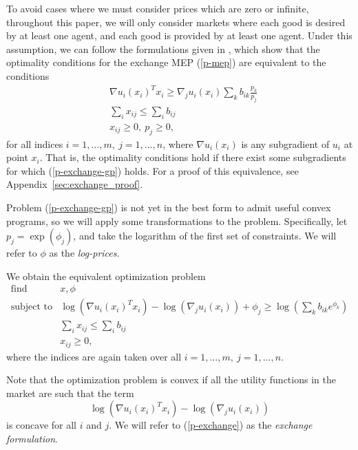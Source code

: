 \documentclass[12pt]{article}
\begin{document}
To avoid cases where we must consider prices which are zero or infinite,
throughout this paper, we will only consider markets where each good is desired
by at least one agent, and each good is provided by at least one agent. Under
this assumption, we can follow the formulations given in
\cite{jain2007polynomial, chen2007note, nenakov1983algorithm}, which show that
the optimality conditions for the exchange MEP (\ref{p-mep}) are equivalent to
the conditions
\begin{equation}
\begin{array}{ll}
& \nabla u_i(x_i)^T x_i \geq  \nabla_j u_i(x_i) \sum_k b_{ik} \frac{p_k}{p_j}\\
& \sum_i x_{ij} \leq \sum_i b_{ij}\\
& x_{ij} \geq 0,\ p_j \geq 0,
\end{array}
\label{p-exchange-gp}
\end{equation}
for all indices $i=1,\ldots,m,\ j=1,\ldots,n$, where $\nabla u_i(x_i)$
is any subgradient of $u_i$ at point $x_i$. That is, the optimality
conditions hold if there exist some subgradients for which (\ref{p-exchange-gp})
holds.
For a proof of this equivalence, see Appendix~\ref{sec:exchange_proof}.

Problem (\ref{p-exchange-gp}) is not yet in the best form to admit useful
convex programs, so we will apply some transformations to the problem.
Specifically, let $p_j = \exp(\phi_j)$, and take the logarithm of the first set
of constraints. We will refer to $\phi$ as the \emph{log-prices}.

We obtain the equivalent optimization problem
\begin{equation}
\label{p-exchange}
\begin{array}{ll}
\mbox{find} & x, \phi \\
\mbox{subject to} & \log(\nabla u_i(x_i)^T x_i) - \log(\nabla_j u_i(x_i)) + \phi_j 
\geq \log(\sum_k b_{ik} e^{\phi_k})\\
& \sum_i x_{ij} \leq \sum_i b_{ij}\\
& x_{ij} \geq 0,
\end{array}
\end{equation}
where the indices are again taken over all $i=1,\ldots,m,\ j=1,\ldots,n$.

Note that the optimization problem is convex if all the utility functions
in the market are such that the term
\begin{equation}
\label{e-util-constraint}
\log(\nabla u_i(x_i)^T x_i) - \log(\nabla_j u_i(x_i))
\end{equation}
is concave for all $i$ and $j$.
We will refer to (\ref{p-exchange}) as the \emph{exchange formulation}.
\end{document}

